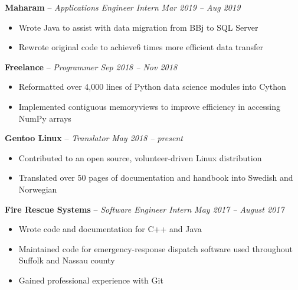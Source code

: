 \documentclass[10pt,letterpaper]{article}
\begin{document}
\vspace{-0.8mm}
\headedsection
{\textbf{Maharam} -- \textit{Applications Engineer Intern}}
{\textit{Mar 2019 -- Aug 2019}} {
	\begin{itemize}[noitemsep,nolistsep]
		\item Wrote Java to assist with data migration from BBj to SQL Server
		\item Rewrote original code to achieve6 times more efficient data transfer
	\end{itemize}
}
\vspace{-1mm}


\headedsection
{\textbf{Freelance} -- \textit{Programmer}}
{\textit{Sep 2018 -- Nov 2018}} {
	\begin{itemize}[noitemsep,nolistsep]
		\item Reformatted over 4,000 lines of Python data science modules into Cython
		\item Implemented contiguous memoryviews to improve efficiency in accessing NumPy arrays
	\end{itemize}
}
\vspace{-1mm}


\headedsection
{\textbf{Gentoo Linux} -- \textit{Translator}}
{\textit{May 2018 -- present}} {
	\begin{itemize}[noitemsep,nolistsep]
		\item Contributed to an open source, volunteer-driven Linux distribution
		\item Translated over 50 pages of documentation and handbook into Swedish and Norwegian
	\end{itemize}
}
\vspace{-1mm}



\headedsection 
{\textbf{Fire Rescue Systems} -- \textit{Software Engineer Intern}}
{\textit{May 2017 -- August 2017}} {
	\begin{itemize}[noitemsep,nolistsep]
		\item Wrote code and documentation for C++ and Java
		\item Maintained code for emergency-response dispatch software used throughout Suffolk and Nassau county
		\item Gained professional experience with Git 
	\end{itemize}
}
\vspace{-1mm}
\end{document}
